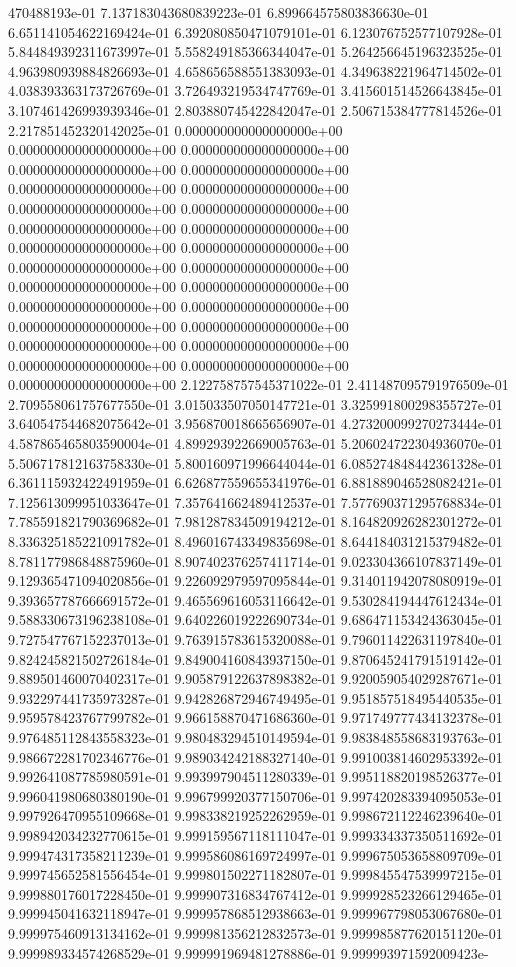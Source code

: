 470488193e-01	7.137183043680839223e-01	6.899664575803836630e-01	6.651141054622169424e-01	6.392080850471079101e-01	6.123076752577107928e-01	5.844849392311673997e-01	5.558249185366344047e-01	5.264256645196323525e-01	4.963980939884826693e-01	4.658656588551383093e-01	4.349638221964714502e-01	4.038393363173726769e-01	3.726493219534747769e-01	3.415601514526643845e-01	3.107461426993939346e-01	2.803880745422842047e-01	2.506715384777814526e-01	2.217851452320142025e-01	0.000000000000000000e+00	0.000000000000000000e+00	0.000000000000000000e+00	0.000000000000000000e+00	0.000000000000000000e+00	0.000000000000000000e+00	0.000000000000000000e+00	0.000000000000000000e+00	0.000000000000000000e+00	0.000000000000000000e+00	0.000000000000000000e+00	0.000000000000000000e+00	0.000000000000000000e+00	0.000000000000000000e+00	0.000000000000000000e+00	0.000000000000000000e+00	0.000000000000000000e+00	0.000000000000000000e+00	0.000000000000000000e+00	0.000000000000000000e+00	0.000000000000000000e+00	0.000000000000000000e+00	0.000000000000000000e+00	0.000000000000000000e+00	0.000000000000000000e+00	0.000000000000000000e+00	2.122758757545371022e-01	2.411487095791976509e-01	2.709558061757677550e-01	3.015033507050147721e-01	3.325991800298355727e-01	3.640547544682075642e-01	3.956870018665656907e-01	4.273200099270273444e-01	4.587865465803590004e-01	4.899293922669005763e-01	5.206024722304936070e-01	5.506717812163758330e-01	5.800160971996644044e-01	6.085274848442361328e-01	6.361115932422491959e-01	6.626877559655341976e-01	6.881889046528082421e-01	7.125613099951033647e-01	7.357641662489412537e-01	7.577690371295768834e-01	7.785591821790369682e-01	7.981287834509194212e-01	8.164820926282301272e-01	8.336325185221091782e-01	8.496016743349835698e-01	8.644184031215379482e-01	8.781177986848875960e-01	8.907402376257411714e-01	9.023304366107837149e-01	9.129365471094020856e-01	9.226092979597095844e-01	9.314011942078080919e-01	9.393657787666691572e-01	9.465569616053116642e-01	9.530284194447612434e-01	9.588330673196238108e-01	9.640226019222690734e-01	9.686471153424363045e-01	9.727547767152237013e-01	9.763915783615320088e-01	9.796011422631197840e-01	9.824245821502726184e-01	9.849004160843937150e-01	9.870645241791519142e-01	9.889501460070402317e-01	9.905879122637898382e-01	9.920059054029287671e-01	9.932297441735973287e-01	9.942826872946749495e-01	9.951857518495440535e-01	9.959578423767799782e-01	9.966158870471686360e-01	9.971749777434132378e-01	9.976485112843558323e-01	9.980483294510149594e-01	9.983848558683193763e-01	9.986672281702346776e-01	9.989034242188327140e-01	9.991003814602953392e-01	9.992641087785980591e-01	9.993997904511280339e-01	9.995118820198526377e-01	9.996041980680380190e-01	9.996799920377150706e-01	9.997420283394095053e-01	9.997926470955109668e-01	9.998338219252262959e-01	9.998672112246239640e-01	9.998942034232770615e-01	9.999159567118111047e-01	9.999334337350511692e-01	9.999474317358211239e-01	9.999586086169724997e-01	9.999675053658809709e-01	9.999745652581556454e-01	9.999801502271182807e-01	9.999845547539997215e-01	9.999880176017228450e-01	9.999907316834767412e-01	9.999928523266129465e-01	9.999945041632118947e-01	9.999957868512938663e-01	9.999967798053067680e-01	9.999975460913134162e-01	9.999981356212832573e-01	9.999985877620151120e-01	9.999989334574268529e-01	9.999991969481278886e-01	9.999993971592009423e-